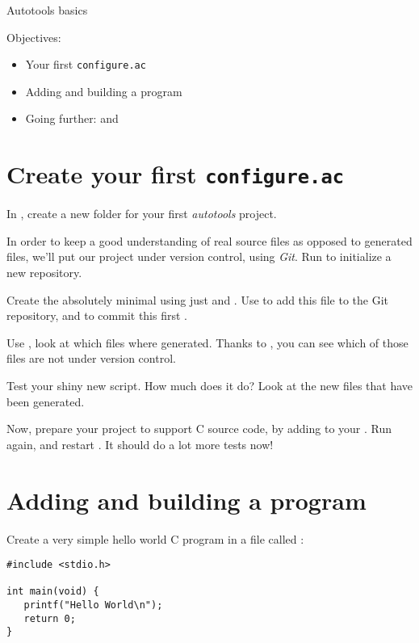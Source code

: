 \subchapter
{Autotools basics}
{Objectives:
  \begin{itemize}
  \item Your first {\tt configure.ac}
  \item Adding and building a program
  \item Going further:  and 
  \end{itemize}
}

\section{Create your first {\tt configure.ac}}

In , create a new folder
 for your first {\em autotools} project.

In order to keep a good understanding of real source files as opposed
to generated files, we'll put our project under version control, using
{\em Git}. Run  to initialize a new repository.

Create the absolutely minimal  using just
 and . Use 
to add this file to the Git repository, and
 to commit this first
.

Use , look at which files where generated. Thanks
to , you can see which of those files are not under
version control.

Test your shiny new  script. How much does it do? Look
at the new files that have been generated.

Now, prepare your project to support C source code, by adding
 to your . Run
 again, and restart . It should
do a lot more tests now!

\section{Adding and building a program}

Create a very simple hello world C program in a file called
:

\begin{verbatim}
#include <stdio.h>

int main(void) {
   printf("Hello World\n");
   return 0;
}
\end{verbatim}


